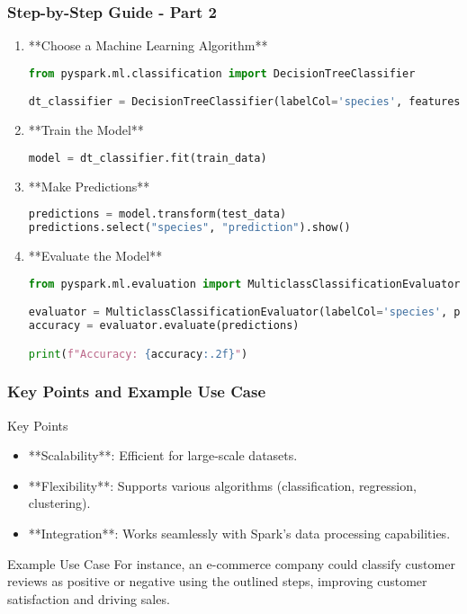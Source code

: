 \documentclass[aspectratio=169]{beamer}
\begin{document}
\begin{frame}[fragile]
    \frametitle{Step-by-Step Guide - Part 2}
    \begin{enumerate}[start=5]
        \item **Choose a Machine Learning Algorithm**
            \begin{lstlisting}[language=Python]
from pyspark.ml.classification import DecisionTreeClassifier

dt_classifier = DecisionTreeClassifier(labelCol='species', featuresCol='features')
            \end{lstlisting}

        \item **Train the Model**
            \begin{lstlisting}[language=Python]
model = dt_classifier.fit(train_data)
            \end{lstlisting}

        \item **Make Predictions**
            \begin{lstlisting}[language=Python]
predictions = model.transform(test_data)
predictions.select("species", "prediction").show()
            \end{lstlisting}

        \item **Evaluate the Model**
            \begin{lstlisting}[language=Python]
from pyspark.ml.evaluation import MulticlassClassificationEvaluator

evaluator = MulticlassClassificationEvaluator(labelCol='species', predictionCol='prediction', metricName='accuracy')
accuracy = evaluator.evaluate(predictions)

print(f"Accuracy: {accuracy:.2f}")
            \end{lstlisting}
    \end{enumerate}
\end{frame}

\begin{frame}[fragile]
    \frametitle{Key Points and Example Use Case}
    \begin{block}{Key Points}
        \begin{itemize}
            \item **Scalability**: Efficient for large-scale datasets.
            \item **Flexibility**: Supports various algorithms (classification, regression, clustering).
            \item **Integration**: Works seamlessly with Spark’s data processing capabilities.
        \end{itemize}
    \end{block}

    \begin{block}{Example Use Case}
        For instance, an e-commerce company could classify customer reviews as positive or negative using the outlined steps, improving customer satisfaction and driving sales.
    \end{block}
\end{frame}
\end{document}
